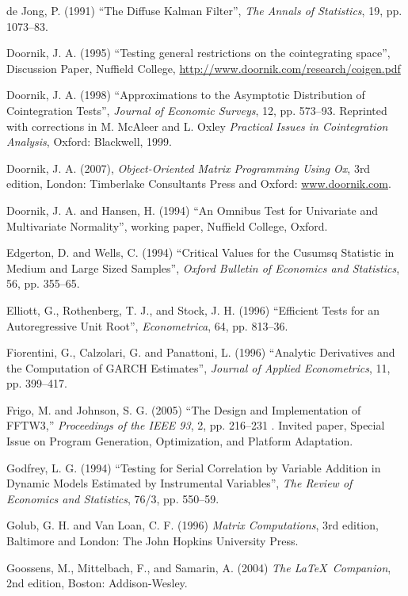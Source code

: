\begin{thebibliography}
  de Jong, P. (1991) ``The Diffuse Kalman Filter'', \emph{The Annals
    of Statistics}, 19, pp. 1073--83.

  Doornik, J. A. (1995) ``Testing general restrictions on the
  cointegrating space'', Discussion Paper, Nuffield College,
  \url{http://www.doornik.com/research/coigen.pdf}

  Doornik, J. A. (1998) ``Approximations to the Asymptotic
  Distribution of Cointegration Tests'', \emph{Journal of Economic
    Surveys}, 12, pp. 573--93.  Reprinted with corrections in M.
  McAleer and L. Oxley \emph{Practical Issues in Cointegration
    Analysis}, Oxford: Blackwell, 1999.

  Doornik, J. A. (2007), \emph{Object-Oriented Matrix Programming
    Using Ox}, 3rd edition, London: Timberlake Consultants Press and
  Oxford: \url{www.doornik.com}.

  Doornik, J. A. and Hansen, H. (1994) ``An Omnibus Test for
  Univariate and Multivariate Normality'', working paper, Nuffield
  College, Oxford.

  Edgerton, D. and Wells, C. (1994) ``Critical Values for the Cusumsq
  Statistic in Medium and Large Sized Samples'', \emph{Oxford Bulletin
    of Economics and Statistics}, 56, pp. 355--65.

  Elliott, G., Rothenberg, T. J., and Stock, J. H. (1996) ``Efficient
  Tests for an Autoregressive Unit Root'', \emph{Econometrica}, 64,
  pp. 813--36.

  Fiorentini, G., Calzolari, G. and Panattoni, L. (1996) ``Analytic
  Derivatives and the Computation of GARCH Estimates'', \emph{Journal
    of Applied Econometrics}, 11, pp. 399--417.

  Frigo, M. and Johnson, S. G. (2005) ``The Design and Implementation of
  FFTW3,'' \emph{Proceedings of the IEEE 93}, 2, pp. 216--231 . Invited
  paper, Special Issue on Program Generation, Optimization, and Platform
  Adaptation.
  
  Godfrey, L. G. (1994) ``Testing for Serial Correlation by Variable
  Addition in Dynamic Models Estimated by Instrumental Variables'', 
  \emph{The Review of Economics and Statistics}, 76/3, pp. 550--59.

  Golub, G. H. and Van Loan, C. F. (1996) \emph{Matrix Computations},
  3rd edition, Baltimore and London: The John Hopkins University
  Press.

  Goossens, M., Mittelbach, F., and Samarin, A. (2004) \emph{The
    \LaTeX\ Companion}, 2nd edition, Boston: Addison-Wesley.


\end{thebibliography}
